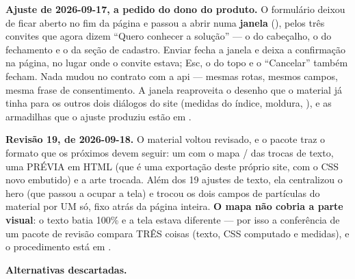 \textbf{Ajuste de 2026-09-17, a pedido do dono do produto.} O formulário deixou
de ficar aberto no fim da página e passou a abrir numa \textbf{janela}
(), pelos três convites que agora dizem \enquote{Quero conhecer a
solução} --- o do cabeçalho, o do fechamento e o da seção de cadastro. Enviar
fecha a janela e deixa a confirmação na página, no lugar onde o convite estava;
Esc, o  do topo e o \enquote{Cancelar} também fecham. Nada mudou no
contrato com a api --- mesmas rotas, mesmos campos, mesma frase de
consentimento. A janela reaproveita o desenho que o material já tinha para os
outros dois diálogos do site (medidas do índice, moldura, ),
e as armadilhas que o ajuste produziu estão em
.

\textbf{Revisão 19, de 2026-09-18.} O material voltou revisado, e o pacote traz
o formato que os próximos devem seguir: um  com o mapa
/ das trocas de texto, uma PRÉVIA em HTML (que é uma
exportação deste próprio site, com o CSS novo embutido) e a arte trocada. Além
dos 19 ajustes de texto, ela centralizou o hero (que passou a ocupar a tela) e
trocou os dois campos de partículas do material por UM só, fixo atrás da página
inteira. \textbf{O mapa não cobria a parte visual}: o texto batia 100\% e a tela
estava diferente --- por isso a conferência de um pacote de revisão compara TRÊS
coisas (texto, CSS computado e medidas), e o procedimento está em
.

\textbf{Alternativas descartadas.}

